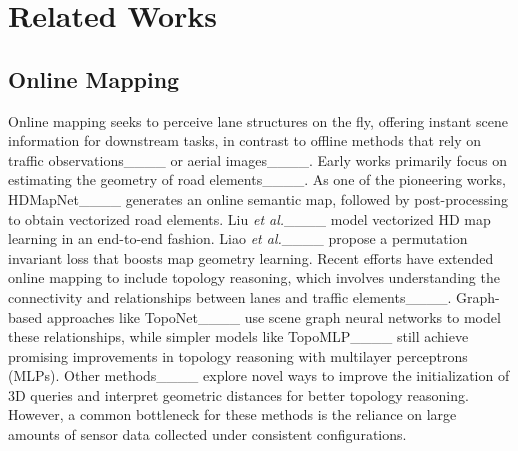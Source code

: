 \section{Related Works}
\subsection{Online Mapping}

Online mapping seeks to perceive lane structures on the fly, offering instant scene information for downstream tasks, in contrast to offline methods that rely on traffic observations____ or aerial images____. Early works primarily focus on estimating the geometry of road elements____. As one of the pioneering works, HDMapNet____ generates an online semantic map, followed by post-processing to obtain vectorized road elements. Liu \textit{et al.}____ model vectorized HD map learning in an end-to-end fashion. Liao \textit{et al.}____ propose a permutation invariant loss that boosts map geometry learning. Recent efforts have extended online mapping to include topology reasoning, which involves understanding the connectivity and relationships between lanes and traffic elements____. Graph-based approaches like TopoNet____ use scene graph neural networks to model these relationships, while simpler models like TopoMLP____ still achieve promising improvements in topology reasoning with multilayer perceptrons (MLPs). Other methods____ explore novel ways to improve the initialization of 3D queries and interpret geometric distances for better topology reasoning. However, a common bottleneck for these methods is the reliance on large amounts of sensor data collected under consistent configurations.



